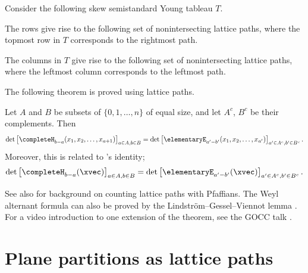 \begin{example}

Consider the following skew semistandard Young tableau $T$.
\begin{figure}
\end{figure}

The rows give rise to the following set of nonintersecting lattice paths,
where the topmost row in $T$ corresponds to the rightmost path.
\begin{figure}
\end{figure}

The columns in $T$ give rise to the following set of nonintersecting lattice paths,
where the leftmost column corresponds to the leftmost path.

\begin{figure}
\end{figure}
\end{example}


The following theorem is proved using lattice paths.
\begin{theorem}
Let $A$ and $B$ be subsets of $\{0,1,\dotsc,n\}$ of equal size, and let
$A^c$, $B^c$ be their complements.
Then
\[
\det \left[
  \completeH_{b-a}(x_1,x_2,\dotsc,x_{a+1})
\right]_{a \in A, b \in B}
=
\det \left[
  \elementaryE_{a'-b'}(x_1,x_2,\dotsc,x_{a'})
\right]_{a' \in A^c, b' \in B^c}.
\]
Moreover, this is related to 's identity;
\[
\det \left[ \completeH_{b-a}(\xvec) \right]_{a \in A, b \in B}
=
\det \left[ \elementaryE_{a'-b'}(\xvec) \right]_{a' \in A^c, b' \in B^c}.
\]
\end{theorem}


See also \cite{Stembridge1990} for background on counting lattice paths with Pfaffians.
The Weyl alternant formula can also be proved by the
Lindström--Gessel--Viennot lemma \cite{Xiong2020x}.
For a video introduction to one extension of the theorem, see the GOCC talk
\cite{GOCC2023LGVExtension}.




\section[LGVplanePartitions]{Plane partitions as lattice paths}


